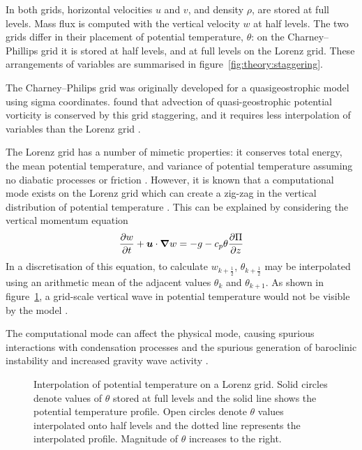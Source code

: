 In both grids, horizontal velocities $u$ and $v$, and density $\rho$, are stored at full levels.  Mass flux is computed with the vertical velocity $w$ at half levels.  The two grids differ in their placement of potential temperature, $\theta$: on the Charney--Phillips grid it is stored at half levels, and at full levels on the Lorenz grid.  These arrangements of variables are summarised in figure~\ref{fig:theory:staggering}.

The Charney--Philips grid was originally developed for a quasigeostrophic model using sigma coordinates.  \textcite{arakawa-moorthi1988} found that advection of quasi-geostrophic potential vorticity is conserved by this grid staggering, and it requires less interpolation of variables than the Lorenz grid \autocite{holdaway2013}. 

The Lorenz grid has a number of mimetic properties: it conserves total energy, the mean potential temperature, and variance of potential temperature assuming no diabatic processes or friction \autocite{arakawa-konor1996}.  However, it is known that a computational mode exists on the Lorenz grid which can create a zig-zag in the vertical distribution of potential temperature \parencites{arakawa-moorthi1988}{arakawa-konor1996}{holdaway2013b}.  This can be explained by considering the vertical momentum equation \autocite{holdaway2013}
\begin{align}
	\frac{\partial w}{\partial t} + \bm{u} \cdot \boldsymbol{\nabla} w = -g - c_p \theta \frac{\partial \Pi}{\partial z}
\end{align}
In a discretisation of this equation, to calculate $w_{k+\frac{1}{2}}$, $\theta_{k+\frac{1}{2}}$ may be interpolated using an arithmetic mean of the adjacent values $\theta_k$ and $\theta_{k+1}$.  As shown in figure~\ref{fig:theory:theta-oscillation}, a grid-scale vertical wave in potential temperature would not be visible by the model \autocite{holdaway2013}.  

The computational mode can affect the physical mode, causing spurious interactions with condensation processes \autocite{arakawa-konor1996} and the spurious generation of baroclinic instability and increased gravity wave activity \parencites{arakawa-moorthi1988}{cullen1997}.

\begin{figure}
	\centering
	
	\caption{Interpolation of potential temperature on a Lorenz grid.  Solid circles denote values of $\theta$ stored at full levels and the solid line shows the potential temperature profile.  Open circles denote $\theta$ values interpolated onto half levels and the dotted line represents the interpolated profile.  Magnitude of $\theta$ increases to the right.}
	\label{fig:theory:theta-oscillation}
\end{figure}
